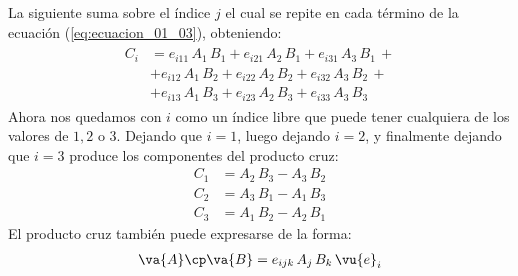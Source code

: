 La siguiente suma sobre el índice $j$ el cual se repite en cada término de la ecuación (\ref{eq:ecuacion_01_03}), obteniendo:
\begin{align}
\begin{aligned}
C_{i} &= e_{i11} \, A_{1} \, B_{1} + e_{i21} \, A_{2} \, B_{1} + e_{i31} \, A_{3} \, B_{1} \, + \\[0.5em]
&+ e_{i12} \, A_{1} \, B_{2} + e_{i22} \, A_{2} \, B_{2} + e_{i32} \, A_{3} \, B_{2} \, + \\[0.5em]
&+ e_{i13} \, A_{1} \, B_{3} + e_{i23} \, A_{2} \, B_{3} + e_{i33} \, A_{3} \, B_{3}
\end{aligned}
\label{eq:ecuacion_01_04}
\end{align}
Ahora nos quedamos con $i$ como un índice libre que puede tener cualquiera de los valores de $1, 2$ o $3$. Dejando que $i = 1$, luego dejando $i = 2$, y finalmente dejando que $i = 3$ produce los componentes del producto cruz:
\begin{align*}
C_{1} &= A_{2} \, B_{3} - A_{3} \, B_{2} \\[0.5em]
C_{2} &= A_{3} \, B_{1} - A_{1} \, B_{3} \\[0.5em]
C_{3} &= A_{1} \, B_{2} - A_{2} \, B_{1}
\end{align*}
El producto cruz también puede expresarse de la forma:
\begin{align*}
\va{A} \cp \va{B} = e_{ijk} \, A_{j} \, B_{k} \, \vu{e}_{i}
\end{align*}





